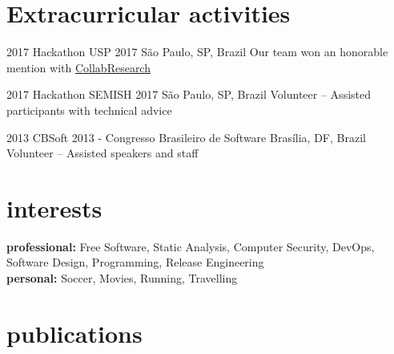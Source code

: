 \documentclass[print]{friggeri-cv}
\begin{document}

\section{Extracurricular activities}

\begin{entrylist}


\entry
{2017}
{Hackathon USP 2017}
{São Paulo, SP, Brazil}
  {Our team won an honorable mention with \href{https://devpost.com/software/collab-research}{CollabResearch}}

\entry
{2017}
{Hackathon SEMISH 2017}
{São Paulo, SP, Brazil}
  {Volunteer -- Assisted participants with technical advice}

\entry
{2013}
{CBSoft 2013 - Congresso Brasileiro de Software}
{Brasília, DF, Brazil}
  {Volunteer -- Assisted speakers and staff}

\end{entrylist}


\section{interests}

\textbf{professional:} Free Software, Static Analysis, Computer Security, DevOps, Software Design, Programming, Release Engineering\\
\textbf{personal:} Soccer, Movies, Running, Travelling


\section{publications}

\end{document}
